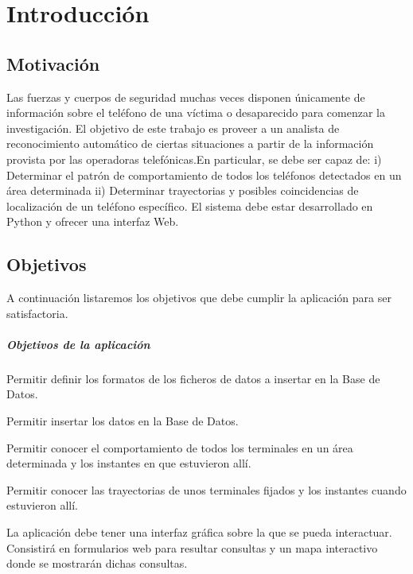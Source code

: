 \chapter{Introducción\label{CAP:INTRODUCCION}}
  \section{Motivación\label{SEC:MOTIVACION}}
    Las fuerzas y cuerpos de seguridad muchas veces disponen únicamente de información sobre el teléfono de una víctima o desaparecido para comenzar la investigación. El objetivo de este trabajo es proveer a un analista de reconocimiento automático de ciertas situaciones a partir de la información provista por las operadoras telefónicas.En particular, se debe ser capaz de:
    i) Determinar el patrón de comportamiento de todos los teléfonos detectados en un área determinada
    ii) Determinar trayectorias y posibles coincidencias de localización de un teléfono específico. 
    El sistema debe estar desarrollado en Python y ofrecer una interfaz Web.
  \section{Objetivos\label{SEC:OBJETIVOS}}
    A continuación listaremos los objetivos que debe cumplir la aplicación para ser satisfactoria.
    \paragraph{Objetivos de la aplicación}
    \begin{objetive}
      \item Permitir definir los formatos de los ficheros de datos a insertar en la Base de Datos.
      \item Permitir insertar los datos en la Base de Datos.
      
      \item Permitir conocer el comportamiento de todos los terminales en un área determinada y los instantes en que estuvieron allí.
      \item Permitir conocer las trayectorias de unos terminales fijados y los instantes cuando estuvieron allí.

      \item La aplicación debe tener una interfaz gráfica sobre la que se pueda interactuar. Consistirá en formularios web para resultar consultas y un mapa interactivo donde se mostrarán dichas consultas.
    \end{objetive}
  

